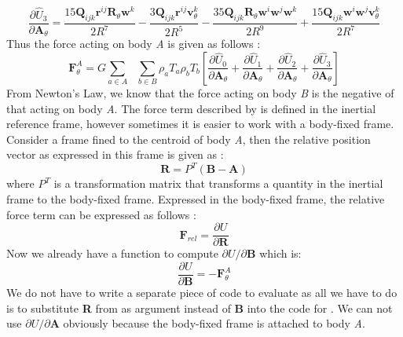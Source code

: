 %
\begin{equation}
\label{u3_diff}
\frac{\partial \hat{U}_3}{\partial \mathbf{A}_\theta} = \frac{15\mathbf{Q}_{ijk} \mathbf{r}^{ij} \mathbf{R}_\theta \mathbf{w}^k}{2R^7} - \frac{3\mathbf{Q}_{ijk} \mathbf{r}^{ij} \mathbf{v}_\theta^k}{2R^5} - \frac{35\mathbf{Q}_{ijk} \mathbf{R}_\theta \mathbf{w}^i \mathbf{w}^j \mathbf{w}^k}{2R^9} + \frac{15\mathbf{Q}_{ijk} \mathbf{w}^i \mathbf{w}^j \mathbf{v}_\theta^k}{2R^7}
\end{equation}
%
Thus the force acting on body \textit{A} is given as follows \cite{fahn_poly}:
\begin{equation}
\label{force_on_A}
\mathbf{F}_\theta^A = G \sum_{a \in A} \text{ } \sum_{b \in B} \rho_a T_a \rho_b T_b \left[\frac{\partial \hat{U}_0}{\partial \mathbf{A}_\theta} + \frac{\partial \hat{U}_1}{\partial \mathbf{A}_\theta} + \frac{\partial \hat{U}_2}{\partial \mathbf{A}_\theta} + \frac{\partial \hat{U}_3}{\partial \mathbf{A}_\theta} \right]
\end{equation}
%
From Newton's Law, we know that the force acting on body \textit{B} is the negative of that acting on body \textit{A}. The force term described by  is defined in the inertial reference frame, however sometimes it is easier to work with a body-fixed frame. Consider a frame fined to the centroid of body \textit{A}, then the relative position vector as expressed in this frame is given as \cite{fahn_poly}:
\begin{equation}
\label{r_bodyfix}
\mathbf{R} = P^T (\mathbf{B} - \mathbf{A})
\end{equation}
%
where $P^T$ is a transformation matrix that transforms a quantity in the inertial frame to the body-fixed frame. Expressed in the body-fixed frame, the relative force term can be expressed as follows \cite{fahn_poly}:
\begin{equation}
\label{F_rel}
\mathbf{F}_{rel} = \frac{\partial U}{\partial \mathbf{R}}
\end{equation}
%
Now we already have a function to compute $\partial U/ \partial \mathbf{B}$ which is:
\begin{equation}
\label{force on B}
\frac{\partial U}{\partial \mathbf{B}} = -\mathbf{F}_\theta^A
\end{equation}
%
We do not have to write a separate piece of code to evaluate  as all we have to do is to substitute \textbf{R} from  as argument instead of \textbf{B} into the code for . We can not use $\partial U/ \partial \mathbf{A}$ obviously because the body-fixed frame is attached to body \textit{A}.

